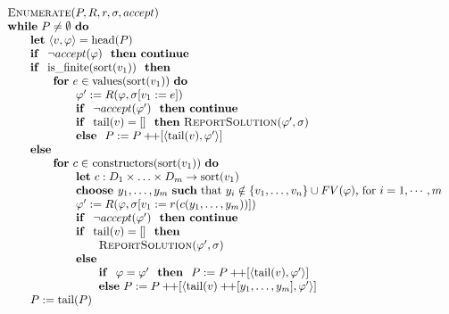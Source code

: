 \documentclass{article}
\newcommand{\concat}{\ensuremath{+\!\!+}}
\begin{document}
\[
\begin{tabular}{l}
\textsc{Enumerate}($P,R,r,\sigma, accept)$ \\
\textbf{while} $P\neq \emptyset $ \textbf{do} \\
\qquad \textbf{let} $\left\langle v,\varphi \right\rangle =\mathrm{head}(P)$ \\
\qquad \textbf{if } $\neg accept(\varphi)$ \textbf{ then continue} \\
\qquad \textbf{if } $\mathrm{is\_finite}(\mathrm{sort}(v_{1}))$ \textbf{ then} \\
\qquad \qquad \textbf{for} $e\in \mathrm{values}(\mathrm{sort}(v_{1}))$ \textbf{do} \\
\qquad \qquad \qquad $\varphi^{\prime}:=R(\varphi,\sigma[v_{1}:=e])$ \\
\qquad \qquad \qquad \textbf{if } $\neg accept(\varphi')$ \textbf{ then continue} \\
\qquad \qquad \qquad \textbf{if } $\mathrm{tail}(v) = []$ \textbf{ then} \textsc{ReportSolution}($\varphi', \sigma$) \\
\qquad \qquad \qquad \textbf{else } $P:=P\concat\lbrack \left\langle \mathrm{tail}(v), \varphi' \right\rangle ]$ \\
\qquad \textbf{else } \\
\qquad \qquad \textbf{for} $c\in $ $\mathrm{constructors}(\mathrm{sort}(v_{1}))$ \textbf{do} \\
\qquad \qquad \qquad \textbf{let} $c:D_{1}\times \ldots \times
D_{m}\rightarrow \mathrm{sort}(v_{1})$ \\
\qquad \qquad \qquad \textbf{choose }$y_{1},\ldots ,y_{m}$
\textbf{such} that $y_i \notin \{ v_1, \ldots ,v_n \} \cup FV(\varphi)$, for $i=1, \cdots, m$ \\
\qquad \qquad \qquad $\varphi ^{\prime }:=R(\varphi ,\sigma \lbrack v_{1}:=r(c(y_{1},\ldots ,y_{m}))])$ \\
\qquad \qquad \qquad \textbf{if } $\neg accept(\varphi')$ \textbf{ then continue} \\
\qquad \qquad \qquad \textbf{if } $\mathrm{tail}(v) = []$ \textbf{ then} \\
\qquad \qquad \qquad \qquad \textsc{ReportSolution}($\varphi', \sigma$) \\
\qquad \qquad \qquad \textbf{else} \\
\qquad \qquad \qquad \qquad \textbf{if } $\varphi = \varphi'$ \textbf{ then }
$P:=P\concat\lbrack \left\langle \mathrm{tail}(v),\varphi'\right\rangle ]$ \\
\qquad \qquad \qquad \qquad \textbf{else}
$P:=P\concat\lbrack \left\langle \mathrm{tail}(v) \concat [y_{1},\ldots ,y_{m}],\varphi'\right\rangle ]$ \\
\qquad $P:=\mathrm{tail}(P)$
\end{tabular}
\]
\end{document}
